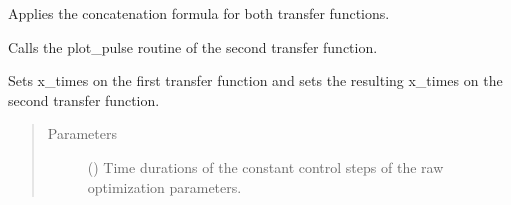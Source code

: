 \documentclass[letterpaper,10pt,english]{sphinxmanual}
\begin{document}
\begin{fulllineitems}
\begin{quote}
\begin{description}
\begin{itemize}
\end{itemize}

\end{description}\end{quote}

\begin{fulllineitems}
\label{\detokenize{qsim:qsim.transfer_function.ConcatenateTF.gradient_chain_rule}}
Applies the concatenation formula for both transfer functions.

\end{fulllineitems}


\begin{fulllineitems}
\label{\detokenize{qsim:qsim.transfer_function.ConcatenateTF.plot_pulse}}
Calls the plot\_pulse routine of the second transfer function.

\end{fulllineitems}


\begin{fulllineitems}
\label{\detokenize{qsim:qsim.transfer_function.ConcatenateTF.set_times}}
Sets x\_times on the first transfer function and sets the resulting
x\_times on the second transfer function.
\begin{quote}\begin{description}
\item[{Parameters}] \leavevmode
{} (\sphinxstyleliteralemphasis{\sphinxupquote{{[}}}\sphinxstyleliteralemphasis{\sphinxupquote{, }}\sphinxstyleliteralemphasis{\sphinxupquote{{]}}}) \textendash{} Time durations of the constant control steps of the raw
optimization parameters.


\end{description}
\end{quote}
\end{fulllineitems}
\end{fulllineitems}
\end{document}
